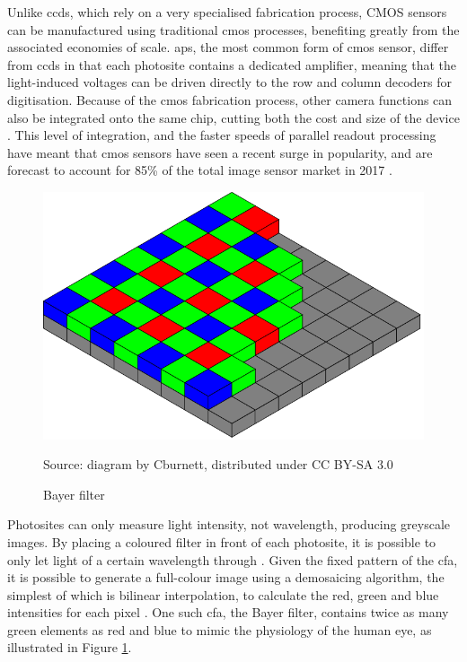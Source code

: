 \documentclass[a4paper]{report}
\begin{document}
Unlike \glspl{ccd}, which rely on a very specialised fabrication process, CMOS sensors can be manufactured using traditional \gls{cmos} processes, benefiting greatly from the associated economies of scale. \gls{aps}, the most common form of \gls{cmos} sensor, differ from \glspl{ccd} in that each photosite contains a dedicated amplifier, meaning that the light-induced voltages can be driven directly to the row and column decoders for digitisation. Because of the \gls{cmos} fabrication process, other camera functions can also be integrated onto the same chip, cutting both the cost and size of the device \cite{10_ge_2012}.  This level of integration, and the faster speeds of parallel readout processing have meant that \gls{cmos} sensors have seen a recent surge in popularity, and are forecast to account for 85\% of the total image sensor market in 2017 \cite{11_ic_insights_2013}.

\begin{figure}
  \centering
  \includegraphics[width=1\textwidth]{bayer_pattern.png}\par
Source: diagram by Cburnett, distributed under CC BY-SA 3.0
  \caption{Bayer filter}
  \label{fig:bayer_pattern}
\end{figure}

Photosites can only measure light intensity, not wavelength, producing greyscale images. By placing a coloured filter in front of each photosite, it is possible to only let light of a certain wavelength through \cite{12_eastman_kodak_company_1976}. Given the fixed pattern of the \gls{cfa}, it is possible to generate a full-colour image using a demosaicing algorithm, the simplest of which is bilinear interpolation, to calculate the red, green and blue intensities for each pixel \cite{13_malvar_he_cutler_2015}. One such \gls{cfa}, the Bayer filter, contains twice as many green elements as red and blue to mimic the physiology of the human eye, as illustrated in Figure \ref{fig:bayer_pattern}.
\end{document}
